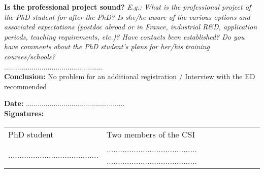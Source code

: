 \documentclass[12pt]{article}
\newcommand{\commentaire}[1]{\small\textit{#1}}
\begin{document}
\noindent\textbf{Is the professional project sound?}
\commentaire{%
  E.g.: What is the professional project of the PhD student for after
  the PhD? Is she/he aware of the various options and associated
  expectations (postdoc abroad or in France, industrial R\&D,
  application periods, teaching requirements, etc.)? Have contacts
  been established? Do you have comments about the PhD student’s
  plans for her/his training courses/schools?\\}
..................................................
\\

\noindent\textbf{Conclusion:}
No problem for an additional registration / Interview with the ED
recommended

\bigskip

\noindent\textbf{Date:}
..................................................
\\

\noindent\textbf{Signatures:}

\begin{tabular}{p{5cm}p{12cm}}
  PhD student & Two members of the CSI\\
  ........................................
  &
  ........................................
  ........................................
\end{tabular}
\end{document}
